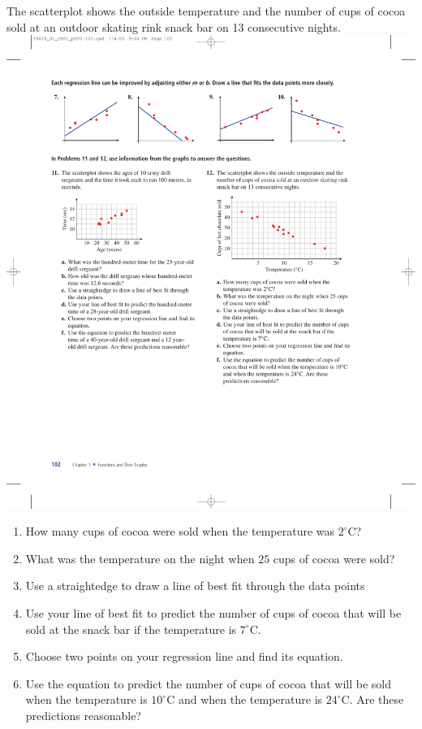\documentclass[10pt,]{book}
\theoremstyle{plain}
\theoremstyle{definition}
\theoremstyle{definition}
\theoremstyle{definition}
\theoremstyle{definition}
\numberwithin{equation}{part}
\newcommand\degree[0]{^{\circ}}
\begin{document}
\begin{exercisegroup}
\exercise[12.]\hypertarget{exercise-368}{}The scatterplot shows the outside temperature and the number of cups of cocoa sold at an outdoor skating rink snack bar on 13 consecutive nights. \includegraphics[width=0.7\linewidth]{images/fig-ex-1-6-12}
 \leavevmode%
\begin{enumerate}[label=*\alph**]
\item\hypertarget{li-1381}{}How many cups of cocoa were sold when the temperature was \(2\degree\)C?%
\item\hypertarget{li-1382}{}What was the temperature on the night when \(25\) cups of cocoa were sold?%
\item\hypertarget{li-1383}{}Use a straightedge to draw a line of best fit through the data points%
\item\hypertarget{li-1384}{}Use your line of best fit to predict the number of cups of cocoa that will be sold at the snack bar if the temperature is \(7\degree\)C.%
\item\hypertarget{li-1385}{}Choose two points on your regression line and find its equation.%
\item\hypertarget{li-1386}{}Use the equation to predict the number of cups of cocoa that will be sold when the temperature is \(10\degree\)C and when the temperature is \(24\degree\)C. Are these predictions reasonable?%
\end{enumerate}
%
\end{exercisegroup}
\par\smallskip\noindent
\end{document}
